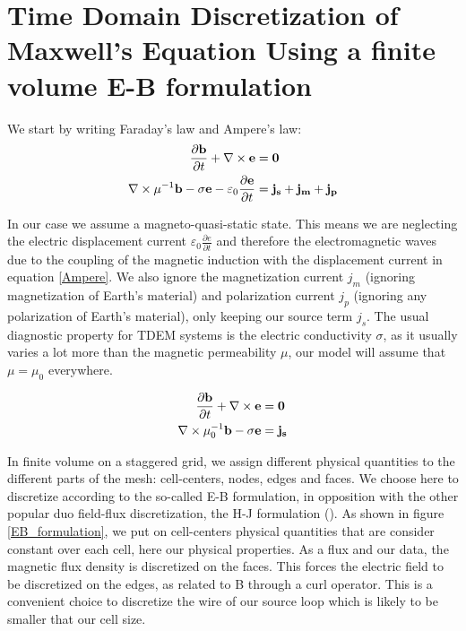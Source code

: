 \documentclass[twoside]{article}
\begin{document}

\section{Time Domain Discretization of Maxwell's Equation Using a finite volume E-B formulation}

We start by writing Faraday's law and Ampere's law:
\begin{align}
\frac{ \partial {\bf b}}{\partial t} + \nabla \times {\bf e} &= {\bf 0} \label{Faraday} \\
\nabla \times \mu^{-1}{\bf b} - \sigma {\bf e} - \varepsilon_0 \frac{\partial {\bf e}}{\partial t} &= \bf{j_s} + \bf{j_m} + \bf{j_p} \label{Ampere}
\end{align}

In our case we assume a magneto-quasi-static state. This means we are neglecting the electric displacement current $\varepsilon_0 \frac{\partial e}{\partial t}$ and therefore the electromagnetic waves due to the coupling of the magnetic induction with the displacement current in equation \ref{Ampere}. We also ignore the magnetization current $j_m$ (ignoring magnetization of Earth's material) and polarization current $j_p$ (ignoring any polarization of Earth's material), only keeping our source term $j_s$. The usual diagnostic property for TDEM systems is the electric conductivity $\sigma$, as it usually varies a lot more than the magnetic permeability $\mu$, our model will assume that $\mu = \mu_0$ everywhere.

\begin{align}
\frac{ \partial {\bf b}}{\partial t} + \nabla \times {\bf e} &= {\bf 0} \\
\nabla \times \mu_0^{-1}{\bf b} - \sigma {\bf e} &= {\bf {j_s}} \label{Ampere_quasistatic}
\end{align}

In finite volume on a staggered grid, we assign different physical quantities to the different parts of the mesh: cell-centers, nodes, edges and faces. We choose here to discretize according to the so-called E-B formulation, in opposition with the other popular duo field-flux discretization, the H-J formulation (\cite{simpegjournal}). As shown in figure \ref{EB_formulation}, we put on cell-centers physical quantities that are consider constant over each cell, here our physical properties. As a flux and our data, the magnetic flux density is discretized on the faces. This forces the electric field to be discretized on the edges, as related to B through a curl operator. This is a convenient choice to discretize the wire of our source loop which is likely to be smaller that our cell size.
\end{document}
